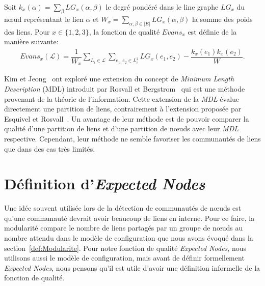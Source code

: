 Soit $k_x(\alpha)= \sum_{\beta}LG_x(\alpha,\beta)$ le degré pondéré dans le line graphe $LG_x$ du n\oe{}ud représentant le lien $\alpha$ et $W_x = \sum_{\alpha,\beta \in |E|}LG_x(\alpha,\beta)$ la somme des poids des liens. Pour $x \in \{1,2,3\}$, la fonction de qualité $Evans_x$ est définie de la manière suivante:
\begin{eqnarray}
Evans_x(\mathcal{L}) = \dfrac{1}{W_x} \sum_{L_i \in \mathcal{L}} \sum_{e_1,e_2 \in L_i^2} LG_x    (e_1,e_2) -  \dfrac{k_x(e_1) k_x(e_2)}{W}.
\end{eqnarray}

Kim et Jeong~\cite{Kim2011} ont exploré une extension du concept de \emph{Minimum Length Description} (MDL) introduit par Rosvall et Bergstrom~\cite{Rosvall2008} qui est une méthode provenant de la théorie de l'information.
Cette extension de la \emph{MDL} évalue directement une partition de liens, contrairement à l'extension proposée par Esquivel et Rosvall~\cite{Esquivel2011}.
Un avantage de leur méthode est de pouvoir comparer la qualité d'une partition de liens et d'une partition de n\oe{}uds avec leur \emph{MDL} respective.
Cependant, leur méthode ne semble favoriser les communautés de liens que dans des cas très limités.


\section{Définition d'\emph{Expected Nodes}}

Une idée souvent utilisée lors de la détection de communautés de n\oe{}uds est qu'une communauté devrait avoir beaucoup de liens en interne.
Pour ce faire, la modularité compare le nombre de liens partagés par un groupe de n\oe{}uds au nombre attendu dans le modèle de configuration que nous avons évoqué dans la section~\ref{def:Modularite}.
Pour notre fonction de qualité \emph{Expected Nodes}, nous utilisons aussi le modèle de configuration, mais avant de définir formellement \emph{Expected Nodes}, nous pensons qu'il est utile d'avoir une définition informelle de la fonction de qualité.

